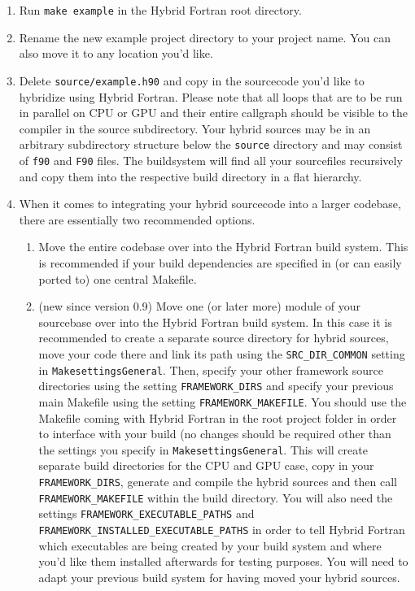 \begin{enumerate}
 \item Run \verb|make example| in the Hybrid Fortran root directory.
 \item Rename the new example project directory to your project name. You can also move it to any location you'd like.
 \item Delete \verb|source/example.h90| and copy in the sourcecode you'd like to hybridize using Hybrid Fortran. Please note that all loops that are to be run in parallel on CPU or GPU and their entire callgraph should be visible to the compiler in the source subdirectory. Your hybrid sources may be in an arbitrary subdirectory structure below the \verb|source| directory and may consist of \verb|f90| and \verb|F90| files. The buildsystem will find all your sourcefiles recursively and copy them into the respective build directory in a flat hierarchy.
 \item When it comes to integrating your hybrid sourcecode into a larger codebase, there are essentially two recommended options.
   \begin{enumerate}
     \item \label{enum:entireCodebase} Move the entire codebase over into the Hybrid Fortran build system. This is recommended if your build dependencies are specified in (or can easily ported to) one central Makefile.
     \item \label{enum:partOfFramework} (new since version 0.9) Move one (or later more) module of your sourcebase over into the Hybrid Fortran build system. In this case it is recommended to create a separate source directory for hybrid sources, move your code there and link its path using the \verb|SRC_DIR_COMMON| setting in \verb|MakesettingsGeneral|. Then, specify your other framework source directories using the setting \verb|FRAMEWORK_DIRS| and specify your previous main Makefile using the setting \verb|FRAMEWORK_MAKEFILE|. You should use the Makefile coming with Hybrid Fortran in the root project folder in order to interface with your build (no changes should be required other than the settings you specify in \verb|MakesettingsGeneral|. This will create separate build directories for the CPU and GPU case, copy in your \verb|FRAMEWORK_DIRS|, generate and compile the hybrid sources and then call \verb|FRAMEWORK_MAKEFILE| within the build directory. You will also need the settings \verb|FRAMEWORK_EXECUTABLE_PATHS| and \verb|FRAMEWORK_INSTALLED_EXECUTABLE_PATHS| in order to tell Hybrid Fortran which executables are being created by your build system and where you'd like them installed afterwards for testing purposes. You will need to adapt your previous build system for having moved your hybrid sources.

\end{enumerate}
\end{enumerate}
